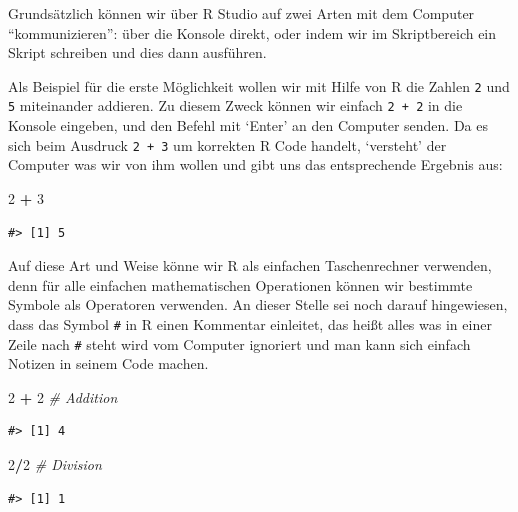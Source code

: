 \documentclass[]{book}
\newenvironment{Shaded}{\begin{snugshade}}{\end{snugshade}}
\newcommand{\DecValTok}[1]{\textcolor[rgb]{0.00,0.00,0.81}{#1}}
\newcommand{\StringTok}[1]{\textcolor[rgb]{0.31,0.60,0.02}{#1}}
\newcommand{\CommentTok}[1]{\textcolor[rgb]{0.56,0.35,0.01}{\textit{#1}}}
\newcommand{\OperatorTok}[1]{\textcolor[rgb]{0.81,0.36,0.00}{\textbf{#1}}}
\begin{document}
Grundsätzlich können wir über R Studio auf zwei Arten mit dem Computer
``kommunizieren'': über die Konsole direkt, oder indem wir im
Skriptbereich ein Skript schreiben und dies dann ausführen.

Als Beispiel für die erste Möglichkeit wollen wir mit Hilfe von R die
Zahlen \texttt{2} und \texttt{5} miteinander addieren. Zu diesem Zweck
können wir einfach \texttt{2\ +\ 2} in die Konsole eingeben, und den
Befehl mit `Enter' an den Computer senden. Da es sich beim Ausdruck
\texttt{2\ +\ 3} um korrekten R Code handelt, `versteht' der Computer
was wir von ihm wollen und gibt uns das entsprechende Ergebnis aus:

\begin{Shaded}
\begin{Highlighting}[]
\DecValTok{2} \OperatorTok{+}\StringTok{ }\DecValTok{3}
\end{Highlighting}
\end{Shaded}

\begin{verbatim}
#> [1] 5
\end{verbatim}

Auf diese Art und Weise könne wir R als einfachen Taschenrechner
verwenden, denn für alle einfachen mathematischen Operationen können wir
bestimmte Symbole als Operatoren verwenden. An dieser Stelle sei noch
darauf hingewiesen, dass das Symbol \texttt{\#} in R einen Kommentar
einleitet, das heißt alles was in einer Zeile nach \texttt{\#} steht
wird vom Computer ignoriert und man kann sich einfach Notizen in seinem
Code machen.

\begin{Shaded}
\begin{Highlighting}[]
\DecValTok{2} \OperatorTok{+}\StringTok{ }\DecValTok{2} \CommentTok{# Addition}
\end{Highlighting}
\end{Shaded}

\begin{verbatim}
#> [1] 4
\end{verbatim}

\begin{Shaded}
\begin{Highlighting}[]
\DecValTok{2}\OperatorTok{/}\DecValTok{2} \CommentTok{# Division}
\end{Highlighting}
\end{Shaded}

\begin{verbatim}
#> [1] 1
\end{verbatim}
\end{document}
